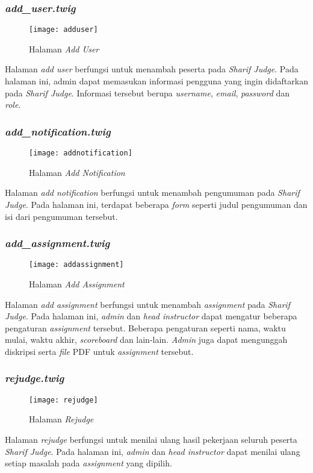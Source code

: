\subsubsection{\textit{add\_user.twig}}
\begin{figure}[H]
	\centering  
	\texttt{[image: adduser]}  
	\caption[Halaman \textit{Add User}]{Halaman \textit{Add User}} 
	\label{fig:adduser} 
\end{figure} 
Halaman \textit{add user} berfungsi untuk menambah peserta pada \textit{Sharif Judge}. Pada halaman ini, admin dapat memasukan informasi pengguna yang ingin didaftarkan pada \textit{Sharif Judge}. Informasi tersebut berupa \textit{username}, \textit{email}, \textit{password} dan \textit{role}.

\subsubsection{\textit{add\_notification.twig}}
\begin{figure}[H]
	\centering  
	\texttt{[image: addnotification]}  
	\caption[Halaman \textit{Add Notification}]{Halaman \textit{Add Notification}} 
	\label{fig:addnotification} 
\end{figure} 
Halaman \textit{add notification} berfungsi untuk menambah pengumuman pada \textit{Sharif Judge}. Pada halaman ini, terdapat beberapa \textit{form} seperti judul pengumuman dan isi dari pengumuman tersebut.  

\subsubsection{\textit{add\_assignment.twig}}
\begin{figure}[H]
	\centering  
	\texttt{[image: addassignment]}  
	\caption[Halaman \textit{Add Assignment}]{Halaman \textit{Add Assignment}} 
	\label{fig:addassignment} 
\end{figure} 
Halaman \textit{add assignment} berfungsi untuk menambah \textit{assignment} pada \textit{Sharif Judge}. Pada halaman ini, \textit{admin} dan \textit{head instructor} dapat mengatur beberapa pengaturan \textit{assignment} tersebut. Beberapa pengaturan seperti nama, waktu mulai, waktu akhir, \textit{scoreboard} dan lain-lain. \textit{Admin} juga dapat mengunggah diskripsi serta \textit{file} PDF untuk \textit{assignment} tersebut.

\subsubsection{\textit{rejudge.twig}}
\begin{figure}[H]
	\centering  
	\texttt{[image: rejudge]}  
	\caption[Halaman \textit{Rejudge}]{Halaman \textit{Rejudge}} 
	\label{fig:rejudge} 
\end{figure} 
Halaman \textit{rejudge} berfungsi untuk menilai ulang hasil pekerjaan seluruh peserta \textit{Sharif Judge}. Pada halaman ini, \textit{admin} dan \textit{head instructor} dapat menilai ulang setiap masalah pada \textit{assignment} yang dipilih.

